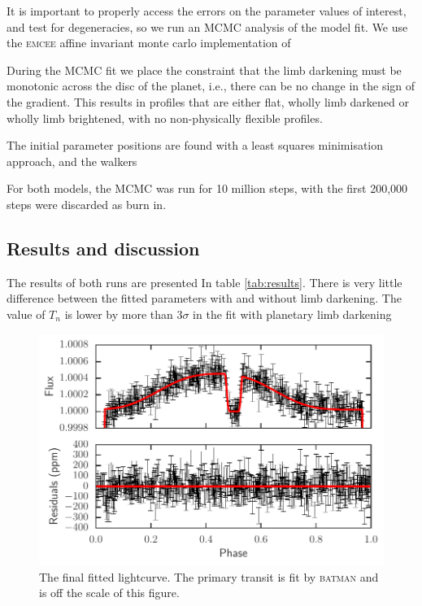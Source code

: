 \documentclass[a4paper,fleqn,usenatbib]{mnras}
\begin{document}
It is important to properly access the errors on the parameter values of interest, and test for degeneracies, so we run an MCMC analysis of the model fit. We use the \textsc{emcee}  affine invariant monte carlo implementation of \citet{Foreman-Mackey2013}

During the MCMC fit we place the constraint that the limb darkening must be monotonic across the disc of the planet, i.e., there can be no change in the sign of the gradient. This results in profiles that are either flat, wholly limb darkened or wholly limb brightened, with no non-physically flexible profiles.

The initial parameter positions are found with a least squares minimisation approach, and the walkers 

For both models, the MCMC was run for 10 million steps, with the first 200,000 steps were discarded as burn in.

\subsection{Results and discussion}\label{sec:results}

The results of both runs are presented In table \ref{tab:results}. There is very little difference between the fitted parameters with and without limb darkening. The value of $T_n$ is lower by more than $3\sigma$ in the fit with planetary limb darkening

\begin{figure}
\begin{center}
\includegraphics[width=\columnwidth]{img/new_lc.pdf}
\caption{The final fitted lightcurve. The primary transit is fit by \textsc{batman} and is off the scale of this figure.}
\label{fig:phase folded}
\end{center}
\end{figure}
\end{document}
